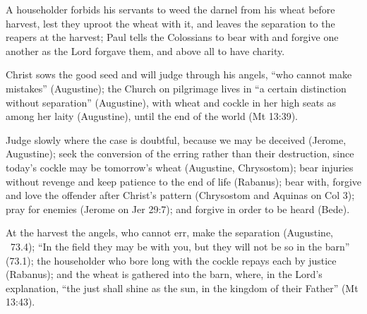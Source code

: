 \begin{fourSenses}
\item[Literal.] A householder forbids his servants to weed the darnel from his
wheat before harvest, lest they uproot the wheat with it, and leaves the
separation to the reapers at the harvest; Paul tells the Colossians to bear
with and forgive one another as the Lord forgave them, and above all to have
charity.
\item[Allegorical.] Christ sows the good seed and will judge through his
angels, ``who cannot make mistakes'' (Augustine); the Church on pilgrimage
lives in ``a certain distinction without separation'' (Augustine), with wheat
and cockle in her high seats as among her laity (Augustine), until the end of
the world (Mt 13:39).
\item[Moral.] Judge slowly where the case is doubtful, because we may be
deceived (Jerome, Augustine); seek the conversion of the erring rather than
their destruction, since today's cockle may be tomorrow's wheat (Augustine,
Chrysostom); bear injuries without revenge and keep patience to the end of
life (Rabanus); bear with, forgive and love the offender after Christ's
pattern (Chrysostom and Aquinas on Col 3); pray for enemies (Jerome on Jer
29:7); and forgive in order to be heard (Bede).
\item[Anagogical.] At the harvest the angels, who cannot err, make the
separation (Augustine, ~73.4); ``In the field they may be with
you, but they will not be so in the barn'' (73.1); the householder who bore
long with the cockle repays each by justice (Rabanus); and the wheat is
gathered into the barn, where, in the Lord's explanation, ``the just shall
shine as the sun, in the kingdom of their Father'' (Mt 13:43).
\end{fourSenses}
